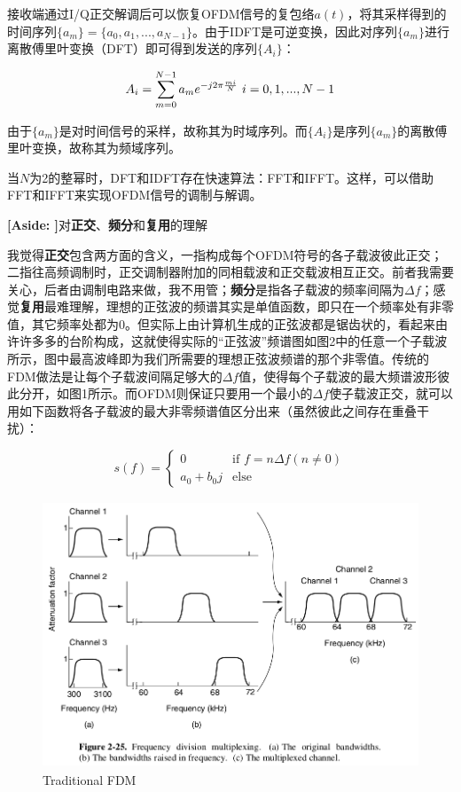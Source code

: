 \documentclass[titlepage]{article}
\numberwithin{figure}{section}
\numberwithin{equation}{section}
\begin{document}
接收端通过I/Q正交解调后可以恢复OFDM信号的复包络$a(t)$，将其采样得到的时间序列$\{a_{m}\}=\{a_{0},a_{1},...,a_{N-1}\}$。由于IDFT是可逆变换，因此对序列$\{a_{m}\}$进行离散傅里叶变换（DFT）即可得到发送的序列$\{A_{i}\}$：

\begin{equation}
	A_{i}=\sum _{m=0} ^{N-1}a_{m}e^{-j2\pi {mi\over N}} \ i = 0,1,...,N-1
\end{equation}

由于$\{a_{m}\}$是对时间信号的采样，故称其为时域序列。而$\{A_{i}\}$是序列$\{a_{m}\}$的离散傅里叶变换，故称其为频域序列。

当$N$为2的整幂时，DFT和IDFT存在快速算法：FFT和IFFT。这样，可以借助FFT和IFFT来实现OFDM信号的调制与解调。

\textbf{[Aside: ]}对\textbf{正交}、\textbf{频分}和\textbf{复用}的理解

我觉得\textbf{正交}包含两方面的含义，一指构成每个OFDM符号的各子载波彼此正交；二指往高频调制时，正交调制器附加的同相载波和正交载波相互正交。前者我需要关心，后者由调制电路来做，我不用管；\textbf{频分}是指各子载波的频率间隔为$\Delta f$；感觉\textbf{复用}最难理解，理想的正弦波的频谱其实是单值函数，即只在一个频率处有非零值，其它频率处都为0。但实际上由计算机生成的正弦波都是锯齿状的，看起来由许许多多的台阶构成，这就使得实际的“正弦波”频谱图如图2中的任意一个子载波所示，图中最高波峰即为我们所需要的理想正弦波频谱的那个非零值。传统的FDM做法是让每个子载波间隔足够大的$\Delta f$值，使得每个子载波的最大频谱波形彼此分开，如图1所示。而OFDM则保证只要用一个最小的$\Delta f$使子载波正交，就可以用如下函数将各子载波的最大非零频谱值区分出来（虽然彼此之间存在重叠干扰）：

\begin{equation}
	s(f)=\left\{
		\begin{array}{ll}
			0 & \textrm{if $f=n\Delta f (n \neq 0)$} \\
			a_{0}+b_{0}j & \textrm{else}
		\end{array}
		\right.
\end{equation}

\begin{figure}[htbp]
	\centering
	\includegraphics[height=3.14159in]{FDM}
	\caption{Traditional FDM}
\end{figure}
\end{document}
